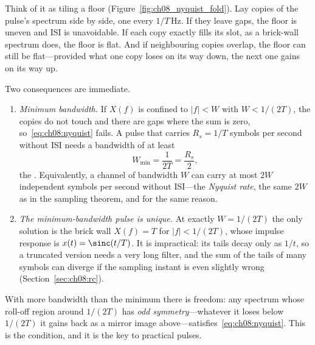 Think of it as tiling a floor (Figure~\ref{fig:ch08_nyquist_fold}). Lay copies of the pulse's
spectrum side by side, one every $1/T$\,Hz. If they leave gaps, the floor is uneven and ISI is
unavoidable. If each copy exactly fills its slot, as a brick-wall spectrum does, the floor is
flat. And if neighbouring copies overlap, the floor can still be flat---provided what one
copy loses on its way down, the next one gains on its way up.

Two consequences are immediate.
\begin{enumerate}
\item \emph{Minimum bandwidth.} If $X(f)$ is confined to $|f|<W$ with $W<1/(2T)$, the copies do
not touch and there are gaps where the sum is zero, so~\eqref{eq:ch08:nyquist} fails. A pulse
that carries $R_s=1/T$ symbols per second without ISI needs a bandwidth of at least
\begin{equation}
W_{\min}=\frac{1}{2T}=\frac{R_s}{2},
\end{equation}
the . Equivalently, a channel of bandwidth $W$ can carry at most $2W$
independent symbols per second without ISI---the \emph{Nyquist rate}, the same $2W$ as in the
sampling theorem, and for the same reason.
\item \emph{The minimum-bandwidth pulse is unique.} At exactly $W=1/(2T)$ the only solution is
the brick wall $X(f)=T$ for $|f|<1/(2T)$, whose impulse response is $x(t)=\sinc(t/T)$. It is
impractical: its tails decay only as $1/t$, so a truncated version needs a very long filter, and
the sum of the tails of many symbols can diverge if the sampling instant is even slightly wrong
(Section~\ref{sec:ch08:rc}).
\end{enumerate}
With more bandwidth than the minimum there is freedom: any spectrum whose roll-off region
around $1/(2T)$ has \emph{odd symmetry}---whatever it loses below $1/(2T)$ it gains back as a
mirror image above---satisfies~\eqref{eq:ch08:nyquist}. This is the 
condition, and it is the key to practical pulses.


